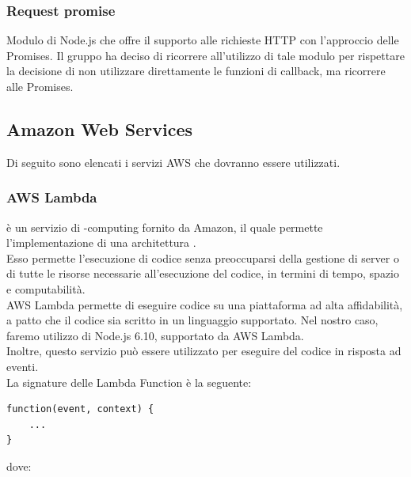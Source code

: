 \subsubsection{Request promise}
Modulo di Node.js che offre il supporto alle richieste HTTP con l'approccio delle Promises. Il gruppo ha deciso di ricorrere all'utilizzo di tale modulo per rispettare la decisione di non utilizzare direttamente le funzioni di callback, ma ricorrere alle Promises.

\subsection{Amazon Web Services}
Di seguito sono elencati i servizi AWS che dovranno essere utilizzati.

\subsubsection{AWS Lambda}
 è un servizio di -computing fornito da Amazon, il quale permette l'implementazione di una architettura . \\
Esso permette l'esecuzione di codice senza preoccuparsi della gestione di server o di tutte le risorse necessarie all'esecuzione del codice, in termini di tempo, spazio e computabilità. \\
AWS Lambda permette di eseguire codice su una piattaforma ad alta affidabilità, a patto che il codice sia scritto in un linguaggio supportato. Nel nostro caso, faremo utilizzo di Node.js 6.10, supportato da AWS Lambda. \\
Inoltre, questo servizio può essere utilizzato per eseguire del codice in risposta ad eventi. \\
La signature delle Lambda Function è la seguente:
\begin{verbatim}
function(event, context) {
    ...
}
\end{verbatim}
dove:
